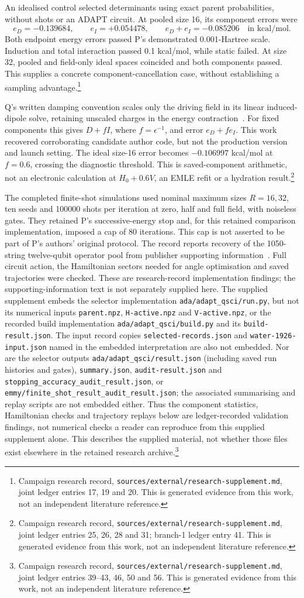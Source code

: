 \documentclass{article}
\newcommand{\record}[1]{\footnote{Campaign research record, \texttt{sources/external/research-supplement.md}, #1. This is generated evidence from this work, not an independent literature reference.}}
\begin{document}
An idealised control selected determinants using exact parent probabilities, without shots or an ADAPT circuit. At pooled size 16, its component errors were
\[
 e_D=-0.139684,\qquad e_I=+0.054478,\qquad
 e_D+e_I=-0.085206
 \quad\text{in kcal/mol}.
\]
Both endpoint energy errors passed P's demonstrated 0.001-Hartree scale. Induction and total interaction passed 0.1 kcal/mol, while static failed. At size 32, pooled and field-only ideal spaces coincided and both components passed. This supplies a concrete component-cancellation case, without establishing a sampling advantage.\record{joint ledger entries 17, 19 and 20}

Q's written damping convention scales only the driving field in its linear induced-dipole solve, retaining unscaled charges in the energy contraction~\cite{Q}. For fixed components this gives \(D+fI\), where \(f=\epsilon^{-1}\), and error \(e_D+fe_I\). This work recovered corroborating candidate author code, but not the production version and launch setting. The ideal size-16 error becomes \(-0.106997\) kcal/mol at \(f=0.6\), crossing the diagnostic threshold. This is saved-component arithmetic, not an electronic calculation at \(H_0+0.6V\), an EMLE refit or a hydration result.\record{joint ledger entries 25, 26, 28 and 31; branch-1 ledger entry 41}

The completed finite-shot simulations used nominal maximum sizes \(R=16,32\), ten seeds and 100000 shots per iteration at zero, half and full field, with noiseless gates. They retained P's successive-energy stop and, for this retained comparison implementation, imposed a cap of 80 iterations. This cap is not asserted to be part of P's authors' original protocol. The record reports recovery of the 1050-string twelve-qubit operator pool from publisher supporting information~\cite{SI,SIfile}. Full circuit action, the Hamiltonian sectors needed for angle optimisation and saved trajectories were checked. These are research-record implementation findings; the supporting-information text is not separately supplied here. The supplied supplement embeds the selector implementation \texttt{ada/adapt\_qsci/run.py}, but not its numerical inputs \texttt{parent.npz}, \texttt{H-active.npz} and \texttt{V-active.npz}, or the recorded build implementation \texttt{ada/adapt\_qsci/build.py} and its \texttt{build-result.json}. The input record copies \texttt{selected-records.json} and \texttt{water-1926-input.json} named in the embedded interpretation are also not embedded. Nor are the selector outputs \texttt{ada/adapt\_qsci/result.json} (including saved run histories and gates), \texttt{summary.json}, \texttt{audit-result.json} and \texttt{stopping\_accuracy\_audit\_result.json}, or \texttt{emmy/finite\_shot\_result\_audit\_result.json}; the associated summarising and replay scripts are not embedded either. Thus the component statistics, Hamiltonian checks and trajectory replays below are ledger-recorded validation findings, not numerical checks a reader can reproduce from this supplied supplement alone. This describes the supplied material, not whether those files exist elsewhere in the retained research archive.\record{joint ledger entries 39--43, 46, 50 and 56}
\end{document}
